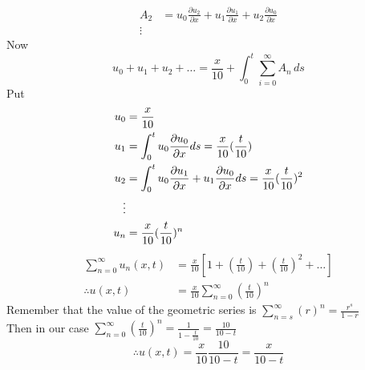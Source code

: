 \documentclass[]{article}
\begin{document}
\begin{example}
\begin{align*}
        \\
        A_2 & = u_0 \frac{\partial u_2}{\partial x} + u_1 \frac{\partial u_1}{\partial x} + u_2 \frac{\partial u_0}{\partial x}
        \\
        \vdots
    \end{align*}
    Now
    \[
        u_0 + u_1 + u_2+\dots = \frac{x}{10} + \int_{0}^{t} \sum_{i=0}^{\infty} A_n  \,ds
    \]
    Put
    \begin{align*}
        u_0 & =  \frac{x}{10}
        \\
        u_1 & = \int_{0}^{t} u_0 \pdv{u_0}{x}ds =\frac{x}{10} (\frac{t}{10})
        \\
        u_2 & = \int_{0}^{t}u_0 \pdv{u_1}{x} + u_1 \pdv{u_0}{x}ds = \frac{x}{10} (\frac{t}{10})^2
        \\
        \vdots
        \\
        u_n & = \frac{x}{10} (\frac{t}{10})^n
    \end{align*}
    \begin{align*}
        \sum_{n=0}^{\infty} u_n(x,t) & = \frac{x}{10}\left[1 +\left(\frac{t}{10}\right) +\left(\frac{t}{10}\right)^2 +\dots \right]
        \\
        \therefore u(x,t)            & = \frac{x}{10}\sum_{n=0}^{\infty} \left(\frac{t}{10}\right)^n
    \end{align*}
    Remember that the value of the geometric series is $\displaystyle \sum_{n=s}^{\infty} \left(r\right)^n  = \frac{r^s}{1-r}  $
    \\
    Then in our case $\displaystyle \sum_{n=0}^{\infty} \left(\frac{t}{10}\right)^n = \frac{1}{1-\frac{t}{10}} = \frac{10}{10-t}$
    \[
        \therefore u(x,t) = \frac{x}{10}\frac{10}{10-t} = \frac{x}{10-t}
    \]

\end{example}
\end{document}
